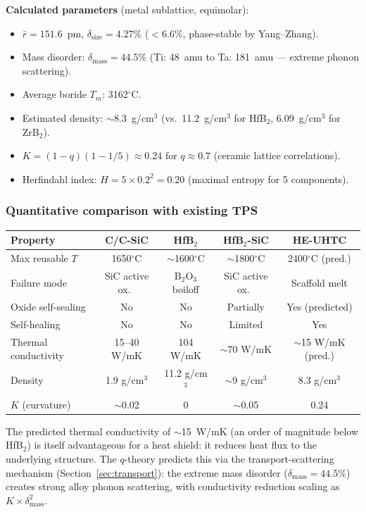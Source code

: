 \documentclass[12pt,letterpaper]{article}
\theoremstyle{definition}
\begin{document}
\textbf{Calculated parameters} (metal sublattice, equimolar):
\begin{itemize}
  \item $\bar{r} = 151.6$~pm, \quad $\delta_{\mathrm{size}} = 4.27\%$ \quad ($< 6.6\%$, phase-stable by Yang--Zhang).
  \item Mass disorder: $\delta_{\mathrm{mass}} = 44.5\%$ \quad (Ti: 48~amu to Ta: 181~amu --- extreme phonon scattering).
  \item Average boride $T_m$: 3162$^\circ$C.
  \item Estimated density: $\sim$8.3~g/cm$^3$ \quad (vs.\ 11.2~g/cm$^3$ for HfB$_2$, 6.09~g/cm$^3$ for ZrB$_2$).
  \item $K = (1-q)(1-1/5) \approx 0.24$ \quad for $q \approx 0.7$ (ceramic lattice correlations).
  \item Herfindahl index: $H = 5 \times 0.2^2 = 0.20$ \quad (maximal entropy for 5 components).
\end{itemize}

\subsubsection{Quantitative comparison with existing TPS}

\begin{center}
\begin{tabular}{@{}lcccc@{}}
\toprule
Property & C/C-SiC & HfB$_2$ & HfB$_2$-SiC & HE-UHTC \\
\midrule
Max reusable $T$ & 1650$^\circ$C & $\sim$1600$^\circ$C & $\sim$1800$^\circ$C & 2400$^\circ$C (pred.) \\
Failure mode & SiC active ox.\ & B$_2$O$_3$ boiloff & SiC active ox.\ & Scaffold melt \\
Oxide self-sealing & No & No & Partially & Yes (predicted) \\
Self-healing & No & No & Limited & Yes \\
Thermal conductivity & 15--40 W/mK & 104 W/mK & $\sim$70 W/mK & $\sim$15 W/mK (pred.) \\
Density & 1.9 g/cm$^3$ & 11.2 g/cm$^3$ & $\sim$9 g/cm$^3$ & 8.3 g/cm$^3$ \\
$K$ (curvature) & $\sim$0.02 & 0 & $\sim$0.05 & 0.24 \\
\bottomrule
\end{tabular}
\end{center}

The predicted thermal conductivity of $\sim$15~W/mK (an order of magnitude below HfB$_2$) is itself advantageous for a heat shield: it reduces heat flux to the underlying structure.  The $q$-theory predicts this via the transport-scattering mechanism (Section~\ref{sec:transport}): the extreme mass disorder ($\delta_{\mathrm{mass}} = 44.5\%$) creates strong alloy phonon scattering, with conductivity reduction scaling as $K \times \delta_{\mathrm{mass}}^2$.
\end{document}
